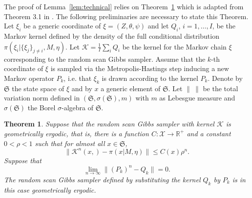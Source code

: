 \documentclass[11pt]{amsart}
\newtheorem{theorem}{Theorem}
\theoremstyle{definition}
\begin{document}
The proof of Lemma~\ref{lem:technical} relies on Theorem~\ref{th:RR}
which is adapted from Theorem 3.1 in \cite{RR07}. The following
preliminaries are necessary to state this Theorem. Let $\xi_i$ be a
generic coordinate of $\xi = (Z, \theta, \psi)$ and let $Q_i$, $i = 1,
\ldots, I$, be the Markov kernel defined by the density of the full
conditional distribution $\pi(\xi_i|\{\xi_j\}_{j\neq i}, M,
\eta)$. Let $\mathcal K = \frac{1}{I}\sum_i Q_i$ be the kernel for the
Markov chain $\xi$ corresponding to the random scan Gibbs
sampler. Assume that the $k$-th coordinate of $\xi$ is sampled via the
Metropolis-Hastings step inducing a new Markov operator $P_k$,
i.e. that $\xi_k$ is drawn according to the kernel $P_k$. Denote by
$\mathfrak S$ the state space of $\xi$ and by $x$ a generic
element of $\mathfrak S$. Let $\|\ \|$ be the total variation norm 
defined in $(\mathfrak S, \sigma(\mathfrak S), m)$ with $m$ as
Lebesgue measure and $\sigma(\mathfrak S)$ the Borel $\sigma$-algebra
of $\mathfrak S$.

\begin{theorem}\label{th:RR} Suppose that the random scan Gibbs
  sampler with kernel $\mathcal K$ is geometrically ergodic, that is,
  there is a function $C:\mathcal X \to \mathbb R^+$ and a constant $0
  < \rho < 1$ such that for almost all $x \in \mathfrak S$,
 \begin{equation}
  \label{eqn:Gibbsergodic}
  \|\mathcal K^n(x, ) - \pi(x|M, \eta)\| \leq C(x)\rho^n.
  \tag{$*$}
 \end{equation}
 Suppose that 
 \begin{equation}
  \label{eqn:MHtofullcond}
   \lim_{n\to\infty} \|(P_k)^n -  Q_k \| = 0. \tag{$**$}
 \end{equation} 
The random scan Gibbs sampler defined by substituting the kernel
$Q_k$ by $P_k$ is in this case geometrically ergodic.
\end{theorem}
\end{document}
